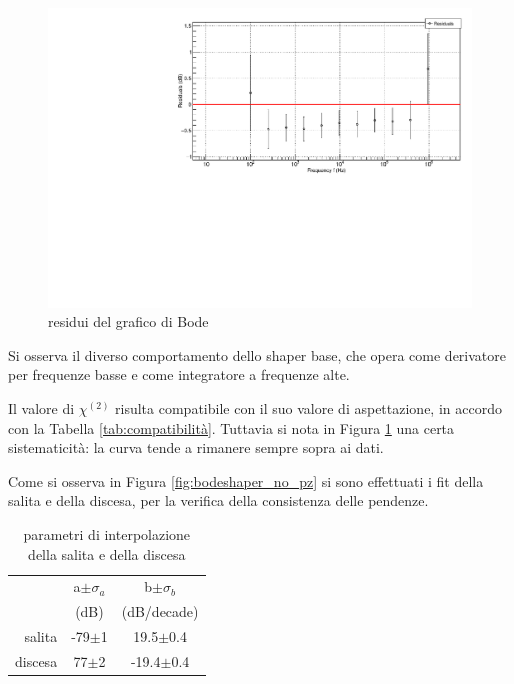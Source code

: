 \documentclass{article}
\begin{document}
\begin{center}
    \begin{figure}[H]
    \centering
    \includegraphics[scale=0.3875, angle=0]{bodeshaperresidui_no_pz.pdf}
    \caption{ residui del grafico di Bode }
    \label{fig:bodeshaperresidui_no_pz}
    \end{figure}
\end{center}


Si osserva il diverso comportamento dello shaper base, che opera come derivatore per frequenze basse e come integratore a frequenze
alte.

Il valore di $\chi^{(2)}$ risulta compatibile con il suo valore di aspettazione, in accordo con la Tabella \ref{tab:compatibilità}.
Tuttavia si nota in Figura \ref{fig:bodeshaperresidui_no_pz} una certa sistematicità: la curva tende
a rimanere sempre sopra ai dati.

Come si osserva in Figura \ref{fig:bodeshaper_no_pz} si sono effettuati i fit della salita e della discesa,
per la verifica della consistenza delle pendenze.


\begin{table}[ht]
    \centering
    \begin{tabular}{rcccc}
        \toprule
                &\multicolumn{2}{c}{a$\pm \sigma_a$} &\multicolumn{2}{c}{b$\pm \sigma_b$}\\
                &\multicolumn{2}{c}{(dB)}  &\multicolumn{2}{c}{(dB/decade)}\\
        \midrule
        salita  &\multicolumn{2}{c}{-79$\pm$1}&\multicolumn{2}{c}{19.5$\pm$0.4}\\
        discesa &\multicolumn{2}{c}{77$\pm$2}&\multicolumn{2}{c}{-19.4$\pm$0.4}\\
        \bottomrule
    \end{tabular}
    \caption{parametri di interpolazione della salita e della discesa}
\end{table}
\end{document}
